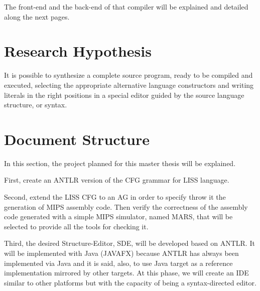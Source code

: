 \documentclass[
  oneside,
  11pt, a4paper,
  footinclude=true,
  headinclude=true,
  cleardoublepage=empty
]{scrbook}
\begin{document}
The front-end and the back-end of that compiler will be explained and detailed along the next pages.

\section{Research Hypothesis}

It is possible to synthesize a complete source program, ready to be compiled and executed, selecting the appropriate alternative language constructors and writing literals in the right positions in a special editor guided by the source language structure, or syntax.


\section{Document Structure}	

In this section, the project planned for this master thesis will be explained.


First, create an ANTLR version of the CFG grammar for LISS language.


Second, extend the LISS CFG to an AG in order to specify throw it the generation of MIPS assembly code.
Then verify the correctness of the assembly code generated with a simple MIPS simulator, named MARS, that will be selected to provide all the tools for checking it.

Third, the desired Structure-Editor, SDE, will be developed based on ANTLR.
It will be implemented with Java (JAVAFX) because ANTLR has always been implemented via Java and it is said, also, to use Java target as a reference implementation mirrored by other targets.
At this phase, we will create an IDE similar to other platforms but with the capacity of being a syntax-directed editor.

\end{document}
